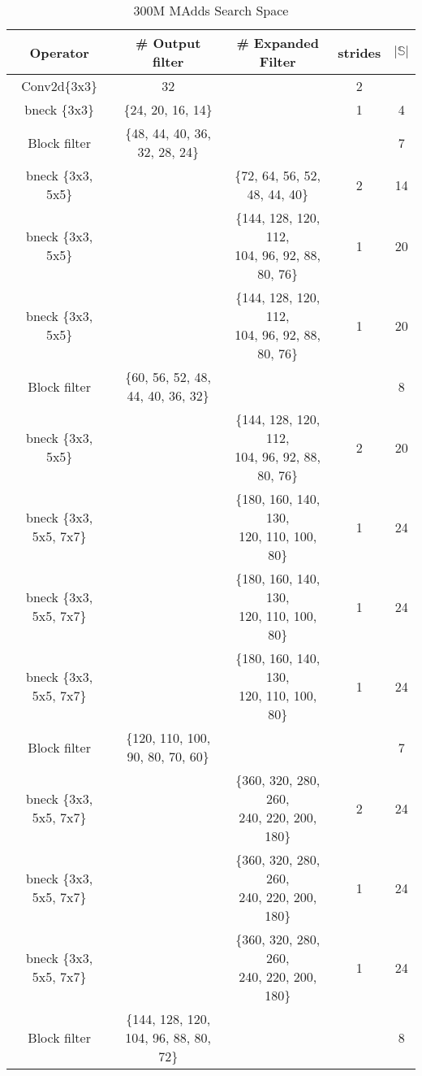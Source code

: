 \begin{table}
\caption{300M MAdds Search Space} 
\begin{center}

\begin{tabular}[hp]{c|c|c|c|c}
\hline
\hline
 Operator  &\# Output filter &\# Expanded Filter &strides &$|\mathbb{S}|$ \\ 
\hline
  Conv2d\{3x3\} &32 & &2 \\
\hline
  bneck \{3x3\} & \{24, 20, 16, 14\} & &1  &4\\
\hline
  Block filter &\{48, 44, 40, 36, 32, 28, 24\} & &  &7\\
  bneck \{3x3, 5x5\} & &\{72, 64, 56, 52, 48, 44, 40\} &2  &14\\
  bneck \{3x3, 5x5\} & &\shortstack{\{144, 128, 120, 112, \\ 104, 96, 92, 88, 80, 76\}} &1 &20 \\
  bneck \{3x3, 5x5\} & &\shortstack{\{144, 128, 120, 112, \\ 104, 96, 92, 88, 80, 76\}} &1 &20 \\
\hline
Block filter &\{60, 56, 52, 48, 44, 40, 36, 32\} & &  &8\\
  bneck \{3x3, 5x5\} & &\shortstack{\{144, 128, 120, 112, \\ 104, 96, 92, 88, 80, 76\}} &2 &20\\
  bneck \{3x3, 5x5, 7x7\} & &\shortstack{\{180, 160, 140, 130,\\ 120, 110, 100, 80\}} &1 &24 \\
  bneck \{3x3, 5x5, 7x7\} & &\shortstack{\{180, 160, 140, 130, \\120, 110, 100, 80\}} &1 &24 \\
  bneck \{3x3, 5x5, 7x7\} & &\shortstack{\{180, 160, 140, 130, \\120, 110, 100, 80\}} &1 &24 \\
\hline
Block filter &\{120, 110, 100, 90, 80, 70, 60\} & & &7 \\
  bneck \{3x3, 5x5, 7x7\} & &\shortstack{\{360, 320, 280, 260, \\ 240, 220, 200, 180\}} &2 &24 \\
  bneck \{3x3, 5x5, 7x7\} & &\shortstack{\{360, 320, 280, 260, \\ 240, 220, 200, 180\}} &1 &24 \\
  bneck \{3x3, 5x5, 7x7\} & &\shortstack{\{360, 320, 280, 260, \\ 240, 220, 200, 180\}} &1 &24 \\
\hline
Block filter &\{144, 128, 120, 104, 96, 88, 80, 72\} & & &8 \\

\end{tabular}
\end{center}
\end{table}
